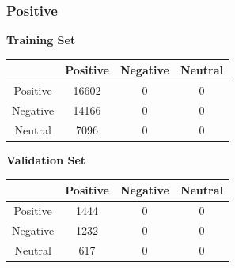\documentclass[12pt,a4paper]{article}
\begin{document}
\subsubsection{Positive}
\begin{center}
\textbf{Training Set}
\begin{center}
\begin{tabular}{|c|c|c|c|}
\hline
 & Positive & Negative & Neutral \\
\hline
Positive & 16602 & 0 & 0 \\
\hline
Negative & 14166 & 0 & 0 \\
\hline
Neutral & 7096 & 0 & 0 \\
\hline
\end{tabular}
\end{center}

\textbf{Validation Set}
\begin{center}
\begin{tabular}{|c|c|c|c|}
\hline
 & Positive & Negative & Neutral \\
\hline
Positive & 1444 & 0 & 0 \\
\hline
Negative & 1232 & 0 & 0 \\
\hline
Neutral & 617 & 0 & 0 \\
\hline
\end{tabular}
\end{center}
\end{center}
\end{document}

